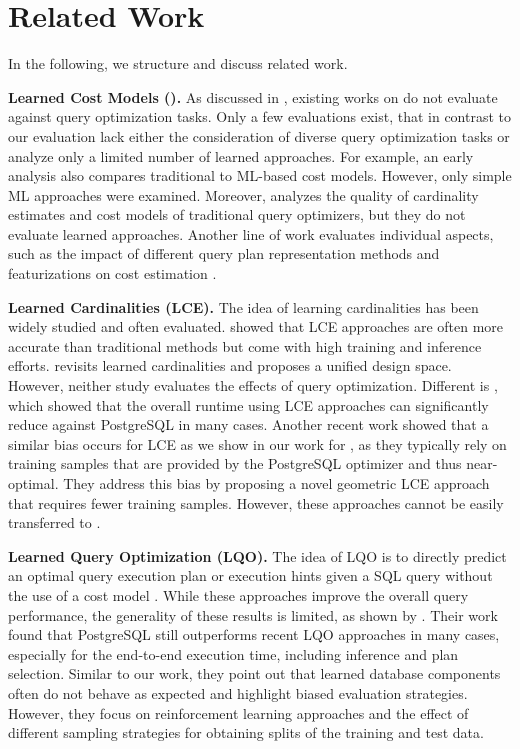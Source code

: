 \section{Related Work}\label{sec:related_work}
In the following, we structure and discuss related work.

\textbf{Learned Cost Models (\lcms).}
As discussed in , existing works on \lcms do not evaluate against query optimization tasks.
Only a few evaluations exist, that in contrast to our evaluation lack either the consideration of diverse query optimization tasks or analyze only a limited number of learned approaches.
For example, an early analysis \cite{wu2013} also compares traditional to ML-based cost models. 
However, only simple ML approaches were examined.
Moreover, \cite{leis_how_2015} analyzes the quality of cardinality estimates and cost models of traditional query optimizers, but they do not evaluate learned approaches.
Another line of work evaluates individual aspects, such as the impact of different query plan representation methods and featurizations on cost estimation \cite{zhao2024, chang2024}. 

\textbf{Learned Cardinalities (LCE).}
The idea of learning cardinalities has been widely studied \cite{kipf2019, hilprecht2020deepdb, naru2019, yang2020} and often evaluated.
\cite{wang2021} showed that LCE approaches are often more accurate than traditional methods but come with high training and inference efforts.
\cite{sun2021} revisits learned cardinalities and proposes a unified design space.
However, neither study evaluates the effects of query optimization.
Different is \cite{kim2022}, which showed that the overall runtime using LCE approaches can significantly reduce against PostgreSQL in many cases.
Another recent work \cite{reiner2023} showed that a similar bias occurs for LCE as we show in our work for \lcms, as they typically rely on training samples that are provided by the PostgreSQL optimizer and thus near-optimal.
They address this bias by proposing a novel geometric LCE approach that requires fewer training samples.
However, these approaches cannot be easily transferred to \lcms.

\textbf{Learned Query Optimization (LQO).}
The idea of LQO is to directly predict an optimal query execution plan or execution hints given a SQL query without the use of a cost model \cite{marcus_bao_2021, yang_balsa_2022, chen2023, zhu2023}.
While these approaches improve the overall query performance, the generality of these results is limited, as shown by \cite{lehmann2024}.
Their work found that PostgreSQL still outperforms recent LQO approaches in many cases, especially for the end-to-end execution time, including inference and plan selection.
Similar to our work, they point out that learned database components often do not behave as expected and highlight biased evaluation strategies.
However, they focus on reinforcement learning approaches and the effect of different sampling strategies for obtaining splits of the training and test data.